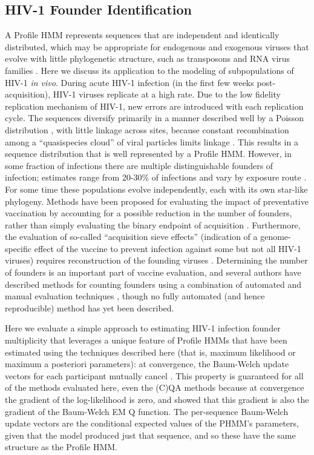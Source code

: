 \documentclass[preprint,12pt,authoryear]{elsarticle}
\begin{document}
\subsection{HIV-1 Founder Identification}
A Profile HMM represents sequences that are independent and identically distributed, which may be appropriate for endogenous and exogenous viruses that evolve with little phylogenetic structure, such as transposons and RNA virus families \citep[sequence weighting strategies to account for subfamily structure have been proposed; see][]{Durbin}. Here we discuss its application to the modeling of subpopulations of HIV-1 \textit{in vivo}.  During acute HIV-1 infection (in the first few weeks post-acquisition), HIV-1 viruses replicate at a high rate. Due to the low fidelity replication mechanism of HIV-1, new errors are introduced with each replication cycle.  The sequences diversify primarily in a manner described well by a Poisson distribution \citep{Giorgi:2010aa}, with little linkage across sites, because constant recombination among a ``quasispecies cloud'' of viral particles limits linkage \citep{Neher1509.02483v1,Wu:2014aa}.  This results in a sequence distribution that is well represented by a Profile HMM.  However, in some fraction of infections there are multiple distinguishable founders of infection; estimates range from 20-30\% of infections and vary by exposure route \citep{Gounder:2015aa, Sterrett:2014aa, Li:2010aa, Gottlieb:2008aa}.  For some time these populations evolve independently, each with its own star-like phylogeny.  Methods have been proposed for evaluating the impact of preventative vaccination by accounting for a possible reduction in the number of founders, rather than simply evaluating the binary endpoint of acquisition \citep{FollmannMultiplicityVE}. Furthermore, the evaluation of so-called ``acquisition sieve effects'' (indication of a genome-specific effect of the vaccine to prevent infection against some but not all HIV-1 viruses) requires reconstruction of the founding viruses \citep{edlefsen2013sieve}. Determining the number of founders is an important part of vaccine evaluation, and several authors have described methods for counting founders using a combination of automated and manual evaluation techniques \citep{Keele:2008aa,Herbeck:2011aa,Rossenkhan:2012aa}, though no fully automated (and hence reproducible) method has yet been described.

Here we evaluate a simple approach to estimating HIV-1 infection founder multiplicity that leverages a unique feature of Profile HMMs that have been estimated using the techniques described here (that is, maximum likelihood or maximum a posteriori parameters): at convergence, the Baum-Welch update vectors for each participant mutually cancel \citep{PaulsPosterAtHIVDynamics2015}.  This property is guaranteed for all of the methods evaluated here, even the (C)QA methods because at convergence the gradient of the log-likelihood is zero, and \cite{Baldi:1994} showed that this gradient is also the gradient of the Baum-Welch EM Q function.  The per-sequence Baum-Welch update vectors are the conditional expected values of the PHMM's parameters, given that the model produced just that sequence, and so these have the same structure as the Profile HMM.
\end{document}
